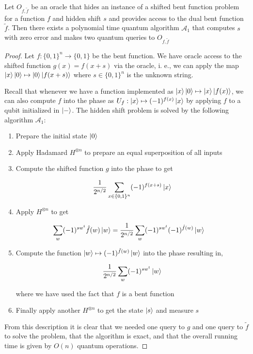 \documentclass[main.tex]{subfiles}
\begin{document}
\begin{theorem}
Let $O_{f,\tilde{f}}$ be an oracle that hides an instance of a shifted bent function problem for a function $f$ and hidden shift $s$ and provides access to the dual bent function $\tilde{f}$. Then there exists a polynomial time quantum algorithm $\mathcal{A}_1$ that computes $s$ with zero error and makes two quantum queries to $O_{f,\tilde{f}}$

\begin{proof}
	Let $f: \{0,1\}^n \rightarrow \{0, 1\}$ be the bent function. We have oracle access to the shifted function $g(x) = f(x+s)$ via the oracle, i. e., we can apply the map $\ket{x}\ket{0} \mapsto \ket{0}\ket{f(x+s)}$ where $s \in \{0, 1\}^n$ is the unknown string. 
	
Recall that whenever we have a function implemented as $\ket{x}\ket{0} \mapsto \ket{x}\ket{f(x)}$, we can also compute $f$ into the phase as $U_f : \ket{x} \mapsto (-1)^{f(x)}\ket{x}$ by applying $f$ to a qubit initialized in $\ket{-}$. The hidden shift problem is solved by the following algorithm $\mathcal{A}_1$: 

\begin{enumerate}
\item Prepare the initial state $\ket{0}$
\item Apply Hadamard $H^{\otimes n}$ to prepare an equal superposition of all inputs
\item Compute the shifted function $g$ into the phase to get

\begin{align*}
\frac{1}{2^{n/2}}\sum_{x \in \{0, 1\}^n}	(-1)^{f(x+s)}\ket{x}
\end{align*}

\item Apply $H^{\otimes n}$ to get

\begin{align*}
\sum_w (-1)^{sw^t}\hat{f}(w) \ket{w} &= \frac{1}{2^{n/2}} \sum_w (-1)^{sw^t}(-1)^{\hat{f}(w)}\ket{w}	
\end{align*}

\item Compute the function $\ket{w} \mapsto (-1)^{\tilde{f}(w)}\ket{w}$ into the phase resulting in,

\begin{align*}
\frac{1}{2^{n/2}}\sum_w (-1)^{sw^t} \ket{w}	
\end{align*}

where we have used the fact that $f$ is a bent function

\item Finally apply another $H^{\otimes n}$ to get the state $\ket{s}$ and measure $s$
\end{enumerate}

From this description it is clear that we needed one query to $g$ and one query to $\tilde{f}$ to solve the problem, that the algorithm is exact, and that the overall running time is given by $O(n)$ quantum operations.
\end{proof}
\end{theorem}
\end{document}

